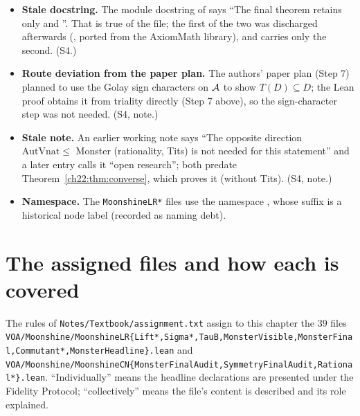 \begin{warning}
\begin{itemize}
input'') describe files in isolation; the gaps are closed in  and
.  (S4.)
\item \textbf{Stale docstring.}  The module docstring of  says ``The final
theorem retains only  and ''.  That is true of the file; the first of the two
was discharged afterwards (, ported from the AxiomMath library), and
 carries only the second.  (S4.)
\item \textbf{Route deviation from the paper plan.}  The authors' paper plan (Step 7) planned to use the Golay sign characters on
$\mathcal{A}$ to show $T(D)\subseteq D$; the Lean proof obtains it from triality directly (Step 7 above), so the sign-character
step was not needed.  (S4, note.)
\item \textbf{Stale note.}  An earlier working note says ``The opposite direction
$\mathrm{AutVnat}\le$ Monster (rationality, Tits) is not needed for this statement'' and a later entry calls it
``open research''; both predate Theorem~\ref{ch22:thm:converse}, which proves it (without Tits).  (S4, note.)
\item \textbf{Namespace.}  The \texttt{MoonshineLR*} files use the namespace , whose suffix is a
  historical node label (recorded as naming debt).
\end{itemize}
\end{warning}

\section{The assigned files and how each is covered}\label{ch22:sec:filemap}

The rules of \texttt{Notes/Textbook/assignment.txt} assign to this chapter the $39$ files
\texttt{VOA/\allowbreak Moonshine/\allowbreak MoonshineLR\{Lift*,\allowbreak Sigma*,\allowbreak TauB,\allowbreak MonsterVisible,\allowbreak MonsterFinal,\allowbreak Commutant*,\allowbreak MonsterHeadline\}.lean} and
\texttt{VOA/\allowbreak Moonshine/\allowbreak MoonshineCN\{MonsterFinalAudit,\allowbreak SymmetryFinalAudit,\allowbreak Rational*\}.lean}.  ``Individually'' means the
headline declarations are presented under the Fidelity Protocol; ``collectively'' means the file's content is described and
its role explained.

